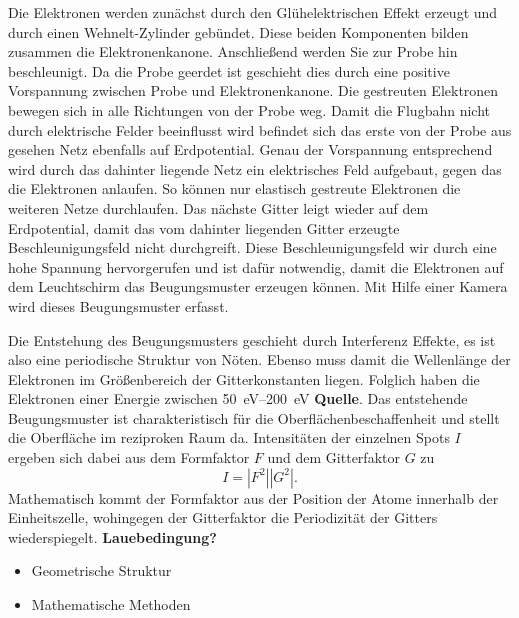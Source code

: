     Die Elektronen werden zunächst durch den Glühelektrischen Effekt erzeugt und durch einen Wehnelt-Zylinder gebündet.
    Diese beiden Komponenten bilden zusammen die Elektronenkanone.
    Anschließend werden Sie zur Probe hin beschleunigt.
    Da die Probe geerdet ist geschieht dies durch eine positive Vorspannung zwischen Probe und Elektronenkanone.
    Die gestreuten Elektronen bewegen sich in alle Richtungen von der Probe weg.
    Damit die Flugbahn nicht durch elektrische Felder beeinflusst wird befindet sich das erste von der Probe aus gesehen Netz ebenfalls auf Erdpotential.
    Genau der Vorspannung entsprechend wird durch das dahinter liegende Netz  ein elektrisches Feld aufgebaut, gegen das die Elektronen anlaufen.
    So können nur elastisch gestreute Elektronen die weiteren Netze durchlaufen.
    Das nächste Gitter leigt wieder auf dem Erdpotential, damit das vom dahinter liegenden Gitter erzeugte Beschleunigungsfeld nicht durchgreift.
    Diese Beschleunigungsfeld wir durch eine hohe Spannung hervorgerufen und ist dafür notwendig, damit die Elektronen auf dem Leuchtschirm das Beugungsmuster erzeugen können.
    Mit Hilfe einer Kamera wird dieses Beugungsmuster erfasst.

    Die Entstehung des Beugungsmusters geschieht durch Interferenz Effekte, es ist also eine periodische Struktur von Nöten.
    Ebenso muss damit die Wellenlänge der Elektronen im Größenbereich der Gitterkonstanten liegen.
    Folglich haben die Elektronen einer Energie zwischen \SIrange{50}{200}{\electronvolt} \textbf{Quelle}.
    Das entstehende Beugungsmuster ist charakteristisch für die Oberflächenbeschaffenheit und stellt die Oberfläche im reziproken Raum da.
    Intensitäten der einzelnen Spots $I$ ergeben sich dabei aus dem Formfaktor $F$ und dem Gitterfaktor $G$ zu
    \begin{equation}
        I = \left|F^2\right|\left|G^2\right|.
        \label{eqn:LEED}
    \end{equation}
    Mathematisch kommt der Formfaktor aus der Position der Atome innerhalb der Einheitszelle, wohingegen der Gitterfaktor die Periodizität der Gitters wiederspiegelt.
    \textbf{Lauebedingung?}

        \begin{itemize}
            \item Geometrische Struktur
            \item Mathematische Methoden
        \end{itemize}

